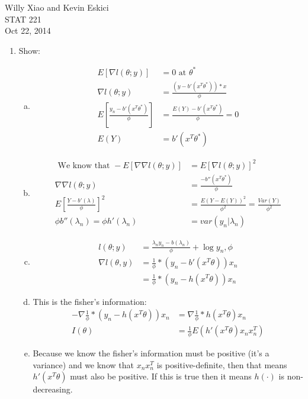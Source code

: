 \documentclass[paper=a4, fontsize=11pt]{scrartcl}
\begin{document}
\noindent Willy Xiao and Kevin Eskici \\ STAT 221 \\ Oct 22, 2014
\begin{enumerate}
  \item Show: \\
    \begin{enumerate}[(a)]
      \item \begin{align*}
        E\left[ \nabla l(\theta; y) \right] &= 0 \text{ at }\theta^* \\
        \nabla l(\theta; y) &= \frac{(y - b'(x^T\theta^*))*x}{\phi} \\
        E\left[ \frac{y_n - b'(x^T\theta^*)}{\phi} \right] &= \frac{E(Y) - b'(x^T\theta^*)}{\phi} = 0 \\
        E(Y) &= b'(x^T\theta^*)
      \end{align*}
      \item \begin{align*}
        \text{ We know that } -E\left[ \nabla \nabla l(\theta; y) \right] &= E\left[ \nabla l(\theta; y) \right]^2 \\
        \nabla \nabla l(\theta; y) &= \frac{-b''(x^T\theta^*)}{\phi} \\
        E\left[ \frac{Y - b'(\lambda)}{\phi} \right]^2 &= \frac{E(Y - E(Y))^2}{\phi^2} = \frac{Var(Y)}{\phi^2} \\
        \phi b''(\lambda_n) = \phi h'(\lambda_n) &= var(y_n|\lambda_n)
      \end{align*}
      \item \begin{align*}
        l(\theta; y) &= \frac{\lambda_ny_n - b(\lambda_n)}{\phi} + \log{y_n, \phi} \\
        \nabla l(\theta, y) &= \frac{1}{\phi}*(y_n - b'(x^T\theta))x_n \\
          &= \frac{1}{\phi}*(y_n - h(x^T\theta))x_n
      \end{align*}
      \item This is the fisher's information:
        \begin{align*}
          - \nabla \frac{1}{\phi}*(y_n - h(x^T\theta))x_n &= \nabla \frac{1}{\phi}*h(x^T\theta)x_n \\
          I(\theta) &= \frac{1}{\phi} E(h'(x^T\theta)x_nx_n^T)
        \end{align*}
      \item Because we know the fisher's information must be positive (it's a variance) and we know that $x_nx_n^T$ is positive-definite, then that means $h'(x^T\theta)$ must also be positive. If this is true then it means $h(\cdot)$ is non-decreasing.

\end{enumerate}
\end{enumerate}
\end{document}
